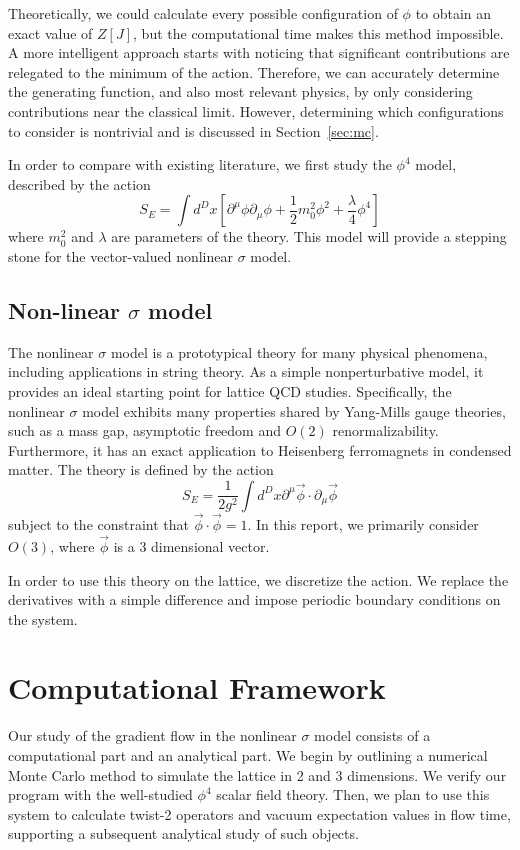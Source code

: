 \documentclass[12pt]{article}
\begin{document}
Theoretically, we could calculate every possible configuration of $\phi$ to obtain an exact value of $Z[J]$, but the computational time makes this method impossible. A more intelligent approach starts with noticing that significant contributions are relegated to the minimum of the action. Therefore, we can accurately determine the generating function, and also most relevant physics, by only considering contributions near the classical limit. However, determining which configurations to consider is nontrivial and is discussed in Section~\ref{sec:mc}.

In order to compare with existing literature, we first study the $\phi^4$ model, described by the action 
\begin{equation}
    S_E = \int d^D x \left[ \partial^\mu \phi \partial_\mu\phi + \frac{1}{2} m_0^2 \phi^2 + \frac{\lambda}{4}\phi^4\right]
\end{equation}
where $m_0^2$ and $\lambda$ are parameters of the theory. This model will provide a stepping stone for the vector-valued nonlinear $\sigma$ model.

\subsection{Non-linear $\sigma$ model}

The nonlinear $\sigma$ model is a prototypical theory for many physical phenomena, including applications in string theory. As a simple nonperturbative model, it provides an ideal starting point for lattice QCD studies. Specifically, the nonlinear $\sigma$ model exhibits many properties shared by Yang-Mills gauge theories, such as a mass gap, asymptotic freedom and $O(2)$ renormalizability. Furthermore, it has an exact application to Heisenberg ferromagnets in condensed matter. The theory is defined by the action 
\begin{equation}
    S_E = \frac{1}{2g^2} \int d^Dx \partial^\mu \vec\phi \cdot \partial_\mu \vec\phi
\end{equation}
subject to the constraint that $\vec\phi\cdot\vec\phi = 1$. In this report, we primarily consider $O(3)$, where $\vec\phi$ is a $3$ dimensional vector.

In order to use this theory on the lattice, we discretize the action. We replace the derivatives with a simple difference and impose periodic boundary conditions on the system.

\section{Computational Framework}
\label{sec:methods}
Our study of the gradient flow in the nonlinear $\sigma$ model consists of a computational part and an analytical part. We begin by outlining a numerical Monte Carlo method to simulate the lattice in 2 and 3 dimensions. We verify our program with the well-studied $\phi^4$ scalar field theory. Then, we plan to use this system to calculate twist-2 operators and vacuum expectation values in flow time, supporting a subsequent analytical study of such objects.
\end{document}
